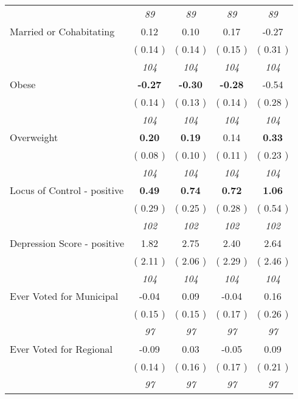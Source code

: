 \begin{tabular}{l c c c c}
& \textit{ 89 } & \textit{ 89 } & \textit{ 89 } & \textit{ 89 } \\
Married or Cohabitating &      0.12 &      0.10 &      0.17 &     -0.27 \\
& (     0.14 ) & (     0.14 ) & (     0.15 ) & (     0.31 ) \\
& \textit{ 104 } & \textit{ 104 } & \textit{ 104 } & \textit{ 104 } \\
Obese & \textbf{     -0.27 } & \textbf{     -0.30 } & \textbf{     -0.28 } &     -0.54 \\
& (     0.14 ) & (     0.13 ) & (     0.14 ) & (     0.28 ) \\
& \textit{ 104 } & \textit{ 104 } & \textit{ 104 } & \textit{ 104 } \\
Overweight & \textbf{      0.20 } & \textbf{      0.19 } &      0.14 & \textbf{     0.33} \\
& (     0.08 ) & (     0.10 ) & (     0.11 ) & (     0.23 ) \\
& \textit{ 104 } & \textit{ 104 } & \textit{ 104 } & \textit{ 104 } \\
Locus of Control - positive & \textbf{      0.49 } & \textbf{      0.74 } & \textbf{      0.72 } & \textbf{     1.06} \\
& (     0.29 ) & (     0.25 ) & (     0.28 ) & (     0.54 ) \\
& \textit{ 102 } & \textit{ 102 } & \textit{ 102 } & \textit{ 102 } \\
Depression Score - positive &      1.82 &      2.75 &      2.40 &      2.64 \\
& (     2.11 ) & (     2.06 ) & (     2.29 ) & (     2.46 ) \\
& \textit{ 104 } & \textit{ 104 } & \textit{ 104 } & \textit{ 104 } \\
Ever Voted for Municipal &     -0.04 &      0.09 &     -0.04 &      0.16 \\
& (     0.15 ) & (     0.15 ) & (     0.17 ) & (     0.26 ) \\
& \textit{ 97 } & \textit{ 97 } & \textit{ 97 } & \textit{ 97 } \\
Ever Voted for Regional &     -0.09 &      0.03 &     -0.05 &      0.09 \\
& (     0.14 ) & (     0.16 ) & (     0.17 ) & (     0.21 ) \\
& \textit{ 97 } & \textit{ 97 } & \textit{ 97 } & \textit{ 97 } \\
\bottomrule
\end{tabular}
